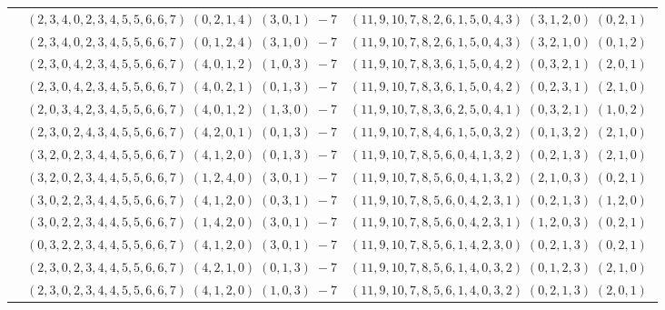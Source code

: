 \documentclass[11pt]{article}
\begin{document}
\begin{longtable}[l]{|c|c|c|}
 \cline{2-3} 
 & $(2 ,3 ,4 ,0 ,2 ,3 ,4 ,5 ,5 ,6 ,6 ,7) \;(0 ,2 ,1 ,4) \;(3 ,0 ,1) \;-7$ & $(11 ,9 ,10 ,7 ,8 ,2 ,6 ,1 ,5 ,0 ,4 ,3) \;(3 ,1 ,2 ,0) \;(0 ,2 ,1) \;$\\ 
 \cline{2-3} 
 & $(2 ,3 ,4 ,0 ,2 ,3 ,4 ,5 ,5 ,6 ,6 ,7) \;(0 ,1 ,2 ,4) \;(3 ,1 ,0) \;-7$ & $(11 ,9 ,10 ,7 ,8 ,2 ,6 ,1 ,5 ,0 ,4 ,3) \;(3 ,2 ,1 ,0) \;(0 ,1 ,2) \;$\\ 
 \cline{2-3} 
 & $(2 ,3 ,0 ,4 ,2 ,3 ,4 ,5 ,5 ,6 ,6 ,7) \;(4 ,0 ,1 ,2) \;(1 ,0 ,3) \;-7$ & $(11 ,9 ,10 ,7 ,8 ,3 ,6 ,1 ,5 ,0 ,4 ,2) \;(0 ,3 ,2 ,1) \;(2 ,0 ,1) \;$\\ 
 \cline{2-3} 
 & $(2 ,3 ,0 ,4 ,2 ,3 ,4 ,5 ,5 ,6 ,6 ,7) \;(4 ,0 ,2 ,1) \;(0 ,1 ,3) \;-7$ & $(11 ,9 ,10 ,7 ,8 ,3 ,6 ,1 ,5 ,0 ,4 ,2) \;(0 ,2 ,3 ,1) \;(2 ,1 ,0) \;$\\ 
 \cline{2-3} 
 & $(2 ,0 ,3 ,4 ,2 ,3 ,4 ,5 ,5 ,6 ,6 ,7) \;(4 ,0 ,1 ,2) \;(1 ,3 ,0) \;-7$ & $(11 ,9 ,10 ,7 ,8 ,3 ,6 ,2 ,5 ,0 ,4 ,1) \;(0 ,3 ,2 ,1) \;(1 ,0 ,2) \;$\\ 
 \cline{2-3} 
 & $(2 ,3 ,0 ,2 ,4 ,3 ,4 ,5 ,5 ,6 ,6 ,7) \;(4 ,2 ,0 ,1) \;(0 ,1 ,3) \;-7$ & $(11 ,9 ,10 ,7 ,8 ,4 ,6 ,1 ,5 ,0 ,3 ,2) \;(0 ,1 ,3 ,2) \;(2 ,1 ,0) \;$\\ 
 \cline{2-3} 
 & $(3 ,2 ,0 ,2 ,3 ,4 ,4 ,5 ,5 ,6 ,6 ,7) \;(4 ,1 ,2 ,0) \;(0 ,1 ,3) \;-7$ & $(11 ,9 ,10 ,7 ,8 ,5 ,6 ,0 ,4 ,1 ,3 ,2) \;(0 ,2 ,1 ,3) \;(2 ,1 ,0) \;$\\ 
 \cline{2-3} 
 & $(3 ,2 ,0 ,2 ,3 ,4 ,4 ,5 ,5 ,6 ,6 ,7) \;(1 ,2 ,4 ,0) \;(3 ,0 ,1) \;-7$ & $(11 ,9 ,10 ,7 ,8 ,5 ,6 ,0 ,4 ,1 ,3 ,2) \;(2 ,1 ,0 ,3) \;(0 ,2 ,1) \;$\\ 
 \cline{2-3} 
 & $(3 ,0 ,2 ,2 ,3 ,4 ,4 ,5 ,5 ,6 ,6 ,7) \;(4 ,1 ,2 ,0) \;(0 ,3 ,1) \;-7$ & $(11 ,9 ,10 ,7 ,8 ,5 ,6 ,0 ,4 ,2 ,3 ,1) \;(0 ,2 ,1 ,3) \;(1 ,2 ,0) \;$\\ 
 \cline{2-3} 
 & $(3 ,0 ,2 ,2 ,3 ,4 ,4 ,5 ,5 ,6 ,6 ,7) \;(1 ,4 ,2 ,0) \;(3 ,0 ,1) \;-7$ & $(11 ,9 ,10 ,7 ,8 ,5 ,6 ,0 ,4 ,2 ,3 ,1) \;(1 ,2 ,0 ,3) \;(0 ,2 ,1) \;$\\ 
 \cline{2-3} 
 & $(0 ,3 ,2 ,2 ,3 ,4 ,4 ,5 ,5 ,6 ,6 ,7) \;(4 ,1 ,2 ,0) \;(3 ,0 ,1) \;-7$ & $(11 ,9 ,10 ,7 ,8 ,5 ,6 ,1 ,4 ,2 ,3 ,0) \;(0 ,2 ,1 ,3) \;(0 ,2 ,1) \;$\\ 
 \cline{2-3} 
 & $(2 ,3 ,0 ,2 ,3 ,4 ,4 ,5 ,5 ,6 ,6 ,7) \;(4 ,2 ,1 ,0) \;(0 ,1 ,3) \;-7$ & $(11 ,9 ,10 ,7 ,8 ,5 ,6 ,1 ,4 ,0 ,3 ,2) \;(0 ,1 ,2 ,3) \;(2 ,1 ,0) \;$\\ 
 \cline{2-3} 
 & $(2 ,3 ,0 ,2 ,3 ,4 ,4 ,5 ,5 ,6 ,6 ,7) \;(4 ,1 ,2 ,0) \;(1 ,0 ,3) \;-7$ & $(11 ,9 ,10 ,7 ,8 ,5 ,6 ,1 ,4 ,0 ,3 ,2) \;(0 ,2 ,1 ,3) \;(2 ,0 ,1) \;$\\ 

\end{longtable}
\end{document}
